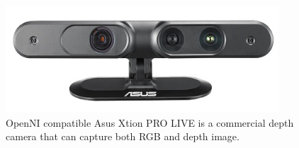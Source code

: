 \begin{figure}
	[h] \centering 
	\includegraphics[height=4cm]{figures/content/xtion.jpg} \caption{OpenNI compatible Asus Xtion PRO LIVE is a commercial depth camera that can capture both RGB and depth image. \cite{9} } \label{fg:xtion} 
\end{figure}
